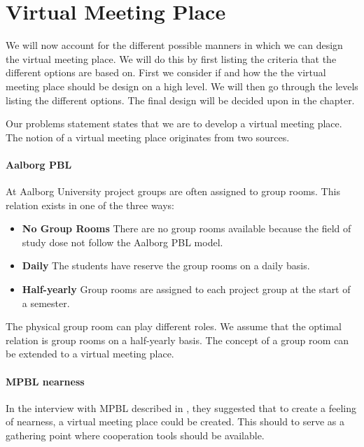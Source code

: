 \section{Virtual Meeting Place}
\label{sec:virtualMeetingPlace}

We will now account for the different possible manners in which we can design the virtual meeting place. 
We will do this by first listing the criteria that the different options are based on. 
First we consider if and how the the virtual meeting place should be design on a high level. 
We will then go through the levels listing the different options. 
The final design will be decided upon in the  chapter. 

Our problems statement states that we are to develop a virtual meeting place. 
The notion of a virtual meeting place originates from two sources.

\paragraph{Aalborg PBL} 
At Aalborg University project groups are often assigned to group rooms. This relation exists in one of the three ways:
\begin{itemize}
	\item \textbf{No Group Rooms} There are no group rooms available because the field of study dose not follow the Aalborg PBL model.
	\item \textbf{Daily} The students have reserve the group rooms on a daily basis.
	\item \textbf{Half-yearly} Group rooms are assigned to each project group at the start of a semester.
\end{itemize} 
The physical group room can play different roles. We assume that the optimal relation is group rooms on a half-yearly basis.
The concept of a group room can be extended to a virtual meeting place.    

\paragraph{MPBL nearness}
In the interview with MPBL described in \secref{}, they suggested that to create a feeling of nearness, a virtual meeting place could be created. This should to serve as a gathering point where cooperation tools should be available. \\

